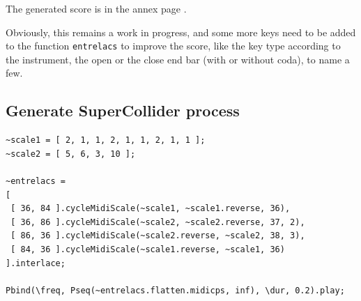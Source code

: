
\noindent The generated score is in the annex page \pageref{clav}.

\bigskip

Obviously, this remains a work in progress, and some more keys need to be added to the function \texttt{entrelacs} to improve the score, like the key type according to the instrument, the open or the close end bar (with or without coda), to name a few.

%

\subsection*{Generate SuperCollider process}


\begin{lstlisting}
~scale1 = [ 2, 1, 1, 2, 1, 1, 2, 1, 1 ];
~scale2 = [ 5, 6, 3, 10 ];

~entrelacs =
[
 [ 36, 84 ].cycleMidiScale(~scale1, ~scale1.reverse, 36),
 [ 36, 86 ].cycleMidiScale(~scale2, ~scale2.reverse, 37, 2),
 [ 86, 36 ].cycleMidiScale(~scale2.reverse, ~scale2, 38, 3),
 [ 84, 36 ].cycleMidiScale(~scale1.reverse, ~scale1, 36)
].interlace;

Pbind(\freq, Pseq(~entrelacs.flatten.midicps, inf), \dur, 0.2).play;
\end{lstlisting}



